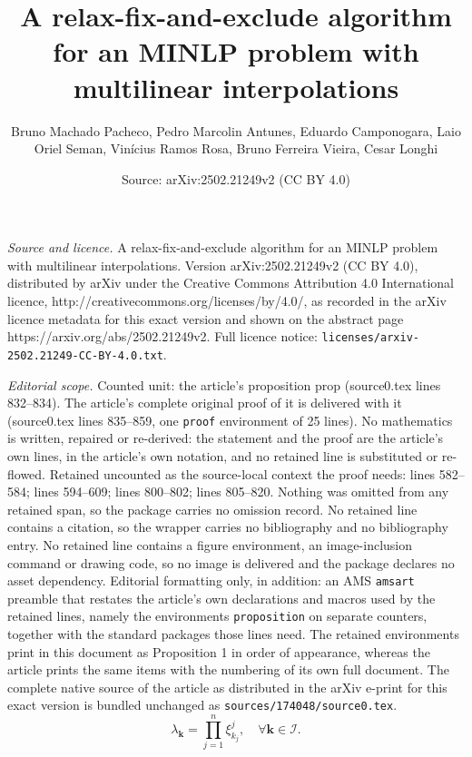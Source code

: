 \documentclass[10pt,a4paper]{amsart}
\title{A relax-fix-and-exclude algorithm for an MINLP problem with multilinear interpolations}
\author{Bruno Machado Pacheco, Pedro Marcolin Antunes, Eduardo Camponogara, Laio Oriel Seman, Vin\'icius Ramos Rosa, Bruno Ferreira Vieira, Cesar Longhi}
\date{Source: arXiv:2502.21249v2 (CC BY 4.0)}
\begin{document}
\maketitle

\noindent\emph{Source and licence.} A relax-fix-and-exclude algorithm for an MINLP problem with multilinear interpolations. Version arXiv:2502.21249v2 (CC BY 4.0), distributed by arXiv under the Creative Commons Attribution 4.0 International licence, http://creativecommons.org/licenses/by/4.0/, as recorded in the arXiv licence metadata for this exact version and shown on the abstract page https://arxiv.org/abs/2502.21249v2. Full licence notice: \texttt{licenses/arxiv-2502.21249-CC-BY-4.0.txt}.\par\smallskip

\noindent\textit{Editorial scope.} Counted unit: the article's proposition prop (source0.tex lines 832--834). The article's complete original proof of it is delivered with it (source0.tex lines 835--859, one \texttt{proof} environment of 25 lines). No mathematics is written, repaired or re-derived: the statement and the proof are the article's own lines, in the article's own notation, and no retained line is substituted or re-flowed.  Retained uncounted as the source-local context the proof needs: lines 582--584; lines 594--609; lines 800--802; lines 805--820.  Nothing was omitted from any retained span, so the package carries no omission record.  No retained line contains a citation, so the wrapper carries no bibliography and no bibliography entry.  No retained line contains a figure environment, an image-inclusion command or drawing code, so no image is delivered and the package declares no asset dependency.  Editorial formatting only, in addition: an AMS \texttt{amsart} preamble that restates the article's own declarations and macros used by the retained lines, namely the environments \texttt{proposition} on separate counters, together with the standard packages those lines need.  The retained environments print in this document as Proposition 1 in order of appearance, whereas the article prints the same items with the numbering of its own full document.  The complete native source of the article as distributed in the arXiv e-print for this exact version is bundled unchanged as \texttt{sources/174048/source0.tex}.
\begin{equation}\label{eq:interpolation-bilinears}
   \lambda_{\bm{k}} = \prod_{j=1}^{n} \xi^j_{k_j},\quad \forall\bm{k} \in \mathcal{I}
.\end{equation}
\end{document}
